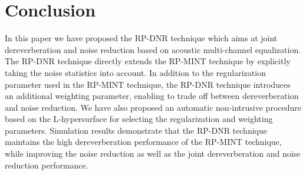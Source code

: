 \documentclass{aes60i}
\begin{document}
\section{Conclusion}

In this paper we have proposed the RP-DNR technique which aims at joint dereverberation and noise reduction based on acoustic multi-channel equalization.
The RP-DNR technique directly extends the RP-MINT technique by explicitly taking the noise statistics into account. 
In addition to the regularization parameter used in the RP-MINT technique, the RP-DNR technique introduces an additional weighting parameter, enabling to trade off between dereverberation and noise reduction.
We have also proposed an automatic non-intrusive procedure based on the L-hypersurface for selecting the regularization and weighting parameters.
Simulation results demonstrate that the RP-DNR technique maintains the high dereverberation performance of the RP-MINT technique, while improving the noise reduction as well as the joint dereverberation and noise reduction performance.

\small






\end{document}
